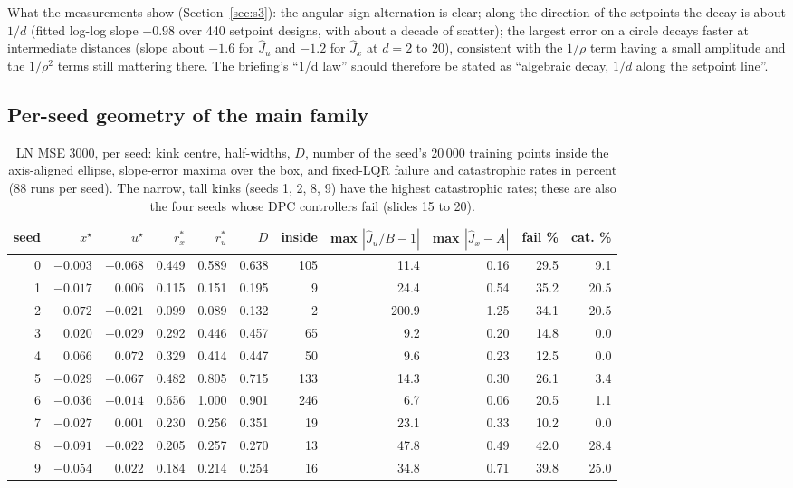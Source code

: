 \documentclass[11pt]{article}
\begin{document}
What the measurements show (Section~\ref{sec:s3}): the angular sign alternation is clear; along the direction of the setpoints the decay is about $1/d$ (fitted log-log slope $-0.98$ over 440 setpoint designs, with about a decade of scatter); the largest error on a circle decays faster at intermediate distances (slope about $-1.6$ for $\hat J_u$ and $-1.2$ for $\hat J_x$ at $d=2$ to $20$), consistent with the $1/\rho$ term having a small amplitude and the $1/\rho^2$ terms still mattering there. The briefing's ``1/d law'' should therefore be stated as ``algebraic decay, $1/d$ along the setpoint line''.

\subsection{Per-seed geometry of the main family}
\begin{table}[H]
\centering
\footnotesize
\setlength{\tabcolsep}{3pt}
\begin{tabular}{rrrrrrrrrrr}
\toprule
seed & $x^\star$ & $u^\star$ & $r^*_x$ & $r^*_u$ & $D$ & inside & max $|\hat J_u/B-1|$ & max $|\hat J_x-A|$ & fail \% & cat. \% \\
\midrule
0 & $-0.003$ & $-0.068$ & 0.449 & 0.589 & 0.638 & 105 & 11.4 & 0.16 & 29.5 & 9.1 \\
1 & $-0.017$ & $0.006$ & 0.115 & 0.151 & 0.195 & 9 & 24.4 & 0.54 & 35.2 & 20.5 \\
2 & $0.072$ & $-0.021$ & 0.099 & 0.089 & 0.132 & 2 & 200.9 & 1.25 & 34.1 & 20.5 \\
3 & $0.020$ & $-0.029$ & 0.292 & 0.446 & 0.457 & 65 & 9.2 & 0.20 & 14.8 & 0.0 \\
4 & $0.066$ & $0.072$ & 0.329 & 0.414 & 0.447 & 50 & 9.6 & 0.23 & 12.5 & 0.0 \\
5 & $-0.029$ & $-0.067$ & 0.482 & 0.805 & 0.715 & 133 & 14.3 & 0.30 & 26.1 & 3.4 \\
6 & $-0.036$ & $-0.014$ & 0.656 & 1.000 & 0.901 & 246 & 6.7 & 0.06 & 20.5 & 1.1 \\
7 & $-0.027$ & $0.001$ & 0.230 & 0.256 & 0.351 & 19 & 23.1 & 0.33 & 10.2 & 0.0 \\
8 & $-0.091$ & $-0.022$ & 0.205 & 0.257 & 0.270 & 13 & 47.8 & 0.49 & 42.0 & 28.4 \\
9 & $-0.054$ & $0.022$ & 0.184 & 0.214 & 0.254 & 16 & 34.8 & 0.71 & 39.8 & 25.0 \\
\bottomrule
\end{tabular}
\caption{LN MSE 3000, per seed: kink centre, half-widths, $D$, number of the seed's 20\,000 training points inside the axis-aligned ellipse, slope-error maxima over the box, and fixed-LQR failure and catastrophic rates in percent (88 runs per seed). The narrow, tall kinks (seeds 1, 2, 8, 9) have the highest catastrophic rates; these are also the four seeds whose DPC controllers fail (slides 15 to 20).}
\label{tab:seeds}
\end{table}
\end{document}
